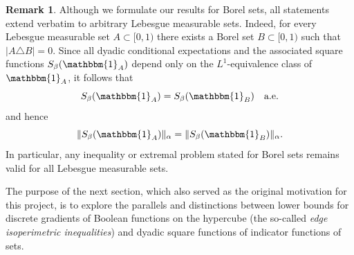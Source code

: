 \documentclass[11pt]{amsart}
\theoremstyle{definition}
\newtheorem{remark}[theorem]{Remark}
\renewcommand{\1}{{\mathbbm{1}}}
\begin{document}
\begin{remark}\label{rmk:Lebesgue}
Although we formulate our results for Borel sets, all statements extend verbatim to arbitrary Lebesgue measurable sets. Indeed, for every Lebesgue measurable set $A \subset [0,1)$ there exists a Borel set $B \subset [0,1)$ such that $|A \triangle B| = 0$. Since all dyadic conditional expectations and the associated square functions $S_\beta(\mathbbm{1}_A)$ depend only on the $L^1$-equivalence class of $\mathbbm{1}_A$, it follows that
\[
S_\beta(\mathbbm{1}_A) = S_\beta(\mathbbm{1}_B) \quad \text{a.e.}
\]
and hence
\[
\|S_\beta(\mathbbm{1}_A)\|_\alpha = \|S_\beta(\mathbbm{1}_B)\|_\alpha.
\]
In particular, any inequality or extremal problem stated for Borel sets remains valid for all Lebesgue measurable sets.
\end{remark}

The purpose of the next section, which also served as the original motivation for this project, is to explore the parallels and distinctions between lower bounds for discrete gradients of Boolean functions on the hypercube (the so-called \emph{edge isoperimetric inequalities}) and dyadic square functions of indicator functions of sets.
\end{document}
